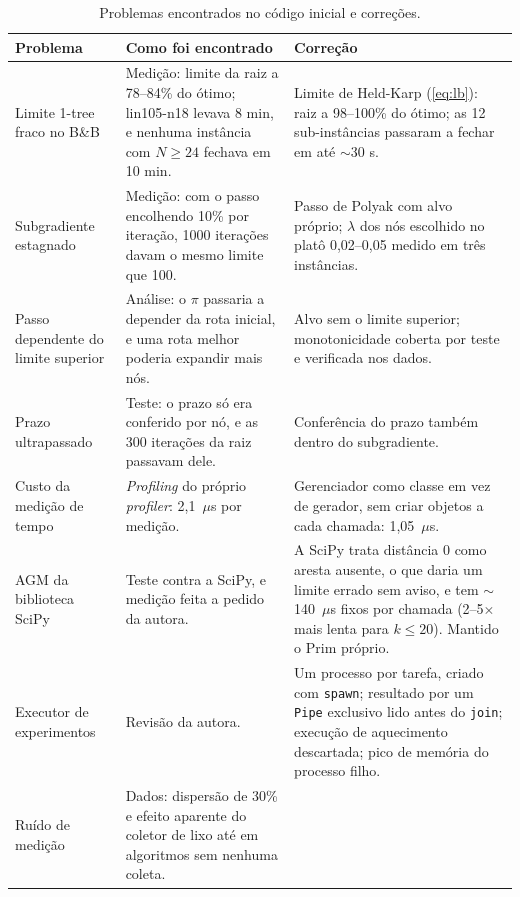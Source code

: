 \begin{table}[htb]
\centering
\caption{Problemas encontrados no código inicial e correções.}
\label{tab:audit}
\footnotesize
\begin{tabularx}{\textwidth}{>{\raggedright\arraybackslash}p{3.3cm}
                             >{\raggedright\arraybackslash}X
                             >{\raggedright\arraybackslash}X}
\toprule
Problema & Como foi encontrado & Correção \\
\midrule
Limite 1-tree fraco no B\&B
  & Medição: limite da raiz a 78--84\% do ótimo; lin105-n18 levava 8 min, e nenhuma
    instância com $N \geq 24$ fechava em 10 min.
  & Limite de Held-Karp (\ref{eq:lb}): raiz a 98--100\% do ótimo; as 12 sub-instâncias
    passaram a fechar em até $\sim$30 s. \\
Subgradiente estagnado
  & Medição: com o passo encolhendo 10\% por iteração, 1000 iterações davam o mesmo
    limite que 100.
  & Passo de Polyak com alvo próprio; $\lambda$ dos nós escolhido no platô
    0{,}02--0{,}05 medido em três instâncias. \\
Passo dependente do limite superior
  & Análise: o $\pi$ passaria a depender da rota inicial, e uma rota melhor poderia
    expandir mais nós.
  & Alvo sem o limite superior; monotonicidade coberta por teste e verificada nos dados. \\
Prazo ultrapassado
  & Teste: o prazo só era conferido por nó, e as 300 iterações da raiz passavam dele.
  & Conferência do prazo também dentro do subgradiente. \\
Custo da medição de tempo
  & \emph{Profiling} do próprio \emph{profiler}: 2{,}1~$\mu$s por medição.
  & Gerenciador como classe em vez de gerador, sem criar objetos a cada chamada:
    1{,}05~$\mu$s. \\
AGM da biblioteca SciPy
  & Teste contra a SciPy, e medição feita a pedido da autora.
  & A SciPy trata distância 0 como aresta ausente, o que daria um limite errado sem aviso,
    e tem $\sim$140~$\mu$s fixos por chamada (2--5$\times$ mais lenta para $k \leq 20$).
    Mantido o Prim próprio. \\
Executor de experimentos
  & Revisão da autora.
  & Um processo por tarefa, criado com \texttt{spawn}; resultado por um \texttt{Pipe}
    exclusivo lido antes do \texttt{join}; execução de aquecimento descartada; pico de
    memória do processo filho. \\
Ruído de medição
  & Dados: dispersão de 30\% e efeito aparente do coletor de lixo até em algoritmos sem
    nenhuma coleta.

\end{tabularx}
\end{table}
